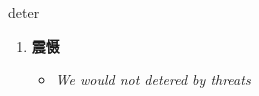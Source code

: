 
\begin{frame}
{\huge deter}
\begin{center}
\begin{enumerate}\Large
  \item \textbf{震慑}
  \begin{itemize}
    \item \em{\Large{We would not detered by threats}}
  \end{itemize}
\end{enumerate}
\end{center}
\end{frame}
